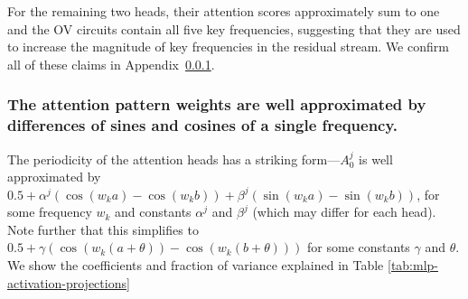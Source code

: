 \documentclass{article} %
\newcommand{\cosp}[1]{\cos \left ( #1 \right )}
\newcommand{\sinp}[1]{\sin \left ( #1 \right )}
\begin{document}
For the remaining two heads, their attention scores approximately sum to one and the OV circuits contain all five key frequencies, suggesting that they are used to increase the magnitude of key frequencies in the residual stream.   We confirm all of these claims in Appendix~\ref{sec:further-analysis}. %


\subsubsection{The attention pattern weights are well approximated by differences of sines and cosines of a single frequency.}
\label{sec:further-analysis}
The periodicity of the attention heads has a striking form---$A^j_0$ is well approximated by $0.5 + \alpha^j(\cos(w_k a) - \cos(w_k b)) + \beta^j(\sin(w_k a) - \sin(w_k b))$, for some frequency $w_k$ and constants $\alpha^j$ and $\beta^j$ (which may differ for each head). Note further that this simplifies to $0.5 + \gamma (\cos(w_k(a+\theta)) - \cos(w_k(b+\theta)))$ for some constants $\gamma$ and $\theta$. We show the coefficients and fraction of variance explained in Table \ref{tab:mlp-activation-projections}
\end{document}
